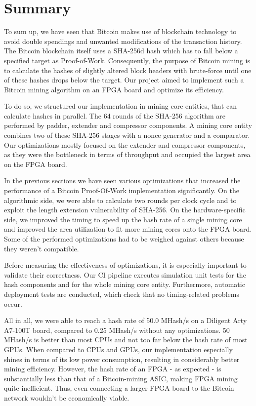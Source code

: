 \section{Summary}


To sum up, we have seen that Bitcoin makes use of blockchain technology to avoid double spendings and unwanted modifications of the transaction history. The Bitcoin blockchain itself uses a SHA-256d hash which has to fall below a specified target as Proof-of-Work. Consequently, the purpose of Bitcoin mining is to calculate the hashes of slightly altered block headers with brute-force until one of these hashes drops below the target. Our project aimed to implement such a Bitcoin mining algorithm on an FPGA board and optimize its efficiency.

To do so, we structured our implementation in mining core entities, that can calculate hashes in parallel. The 64 rounds of the SHA-256 algorithm are performed by padder, extender and compressor components. A mining core entity combines two of these SHA-256 stages with a nonce generator and a comparator. Our optimizations mostly focused on the extender and compressor components, as they were the bottleneck in terms of throughput and occupied the largest area on the FPGA board.

In the previous sections we have seen various optimizations that increased the performance of a Bitcoin Proof-Of-Work implementation significantly. On the algorithmic side, we were able to calculate two rounds per clock cycle and to exploit the length extension vulnerability of SHA-256. On the hardware-specific side, we improved the timing to speed up the hash rate of a single mining core and improved the area utilization to fit more mining cores onto the FPGA board. Some of the performed optimizations had to be weighed against others because they weren't compatible.

Before measuring the effectiveness of optimizations, it is especially important to validate their correctness. Our CI pipeline executes simulation unit tests for the hash components and for the whole mining core entity. Furthermore, automatic deployment tests are conducted, which check that no timing-related problems occur.

All in all, we were able to reach a hash rate of 50.0 MHash/s on a Diligent Arty A7-100T board, compared to 0.25 MHash/s without any optimizations. 50 MHash/s is better than most CPUs and not too far below the hash rate of most GPUs. When compared to CPUs and GPUs, our implementation especially shines in terms of its low power consumption, resulting in considerably better mining efficiency. However, the hash rate of an FPGA - as expected - is substantially less than that of a Bitcoin-mining ASIC, making FPGA mining quite inefficient. Thus, even connecting a larger FPGA board to the Bitcoin network wouldn't be economically viable.

